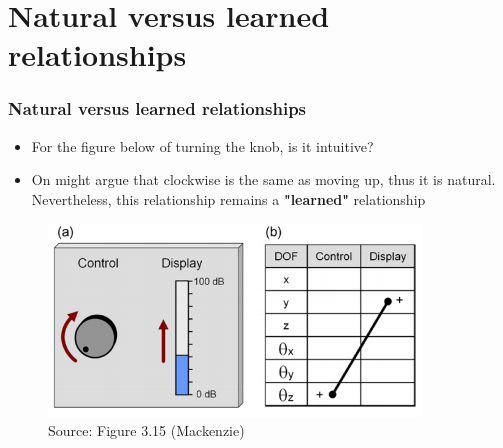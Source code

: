 \documentclass{beamer}
\begin{document}
%

\section{Natural versus learned relationships}

\begin{frame}
	\frametitle{Natural versus learned relationships}
	\begin{itemize}
		\item For the figure below of turning the knob, is it intuitive?
		\item On might argue that clockwise is the same as moving up, thus it is natural.  Nevertheless, this relationship remains a \textbf{"learned"} relationship
	\end{itemize}
	\begin{figure}
		\includegraphics[width=0.7\linewidth]{image/3-15}
		\caption{Source: Figure 3.15 (Mackenzie)}
	\end{figure}
\end{frame}
\end{document}
